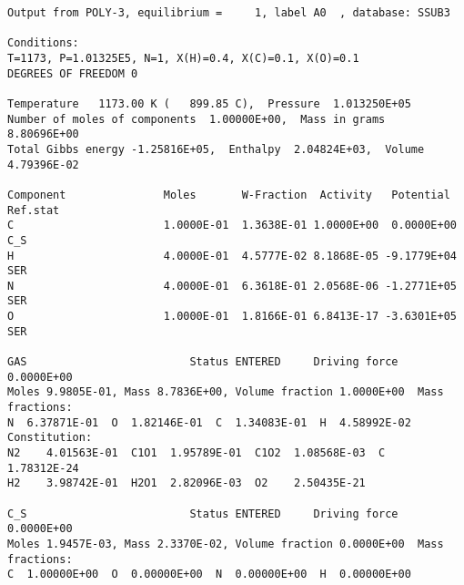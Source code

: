 \begin{lstlisting}[caption={Résultat de la simulation réalisée en utilisant le Code~\ref{lst:point-de-rosee}. En utilisant la fraction $x(\ch{H2O})=2,82\times{}10^{-3}$ et l'Équation~\ref{eq:point_rosee}, on trouve $T_{r}=\SI{263}{\kelvin}$.}]
 Output from POLY-3, equilibrium =     1, label A0  , database: SSUB3   

Conditions:
T=1173, P=1.01325E5, N=1, X(H)=0.4, X(C)=0.1, X(O)=0.1
DEGREES OF FREEDOM 0

Temperature   1173.00 K (   899.85 C),  Pressure  1.013250E+05
Number of moles of components  1.00000E+00,  Mass in grams  8.80696E+00
Total Gibbs energy -1.25816E+05,  Enthalpy  2.04824E+03,  Volume  4.79396E-02

Component               Moles       W-Fraction  Activity   Potential  Ref.stat
C                       1.0000E-01  1.3638E-01 1.0000E+00  0.0000E+00 C_S     
H                       4.0000E-01  4.5777E-02 8.1868E-05 -9.1779E+04 SER     
N                       4.0000E-01  6.3618E-01 2.0568E-06 -1.2771E+05 SER     
O                       1.0000E-01  1.8166E-01 6.8413E-17 -3.6301E+05 SER     

GAS                         Status ENTERED     Driving force  0.0000E+00
Moles 9.9805E-01, Mass 8.7836E+00, Volume fraction 1.0000E+00  Mass fractions:
N  6.37871E-01  O  1.82146E-01  C  1.34083E-01  H  4.58992E-02
Constitution:
N2    4.01563E-01  C1O1  1.95789E-01  C1O2  1.08568E-03  C     1.78312E-24
H2    3.98742E-01  H2O1  2.82096E-03  O2    2.50435E-21

C_S                         Status ENTERED     Driving force  0.0000E+00
Moles 1.9457E-03, Mass 2.3370E-02, Volume fraction 0.0000E+00  Mass fractions:
C  1.00000E+00  O  0.00000E+00  N  0.00000E+00  H  0.00000E+00
\end{lstlisting}